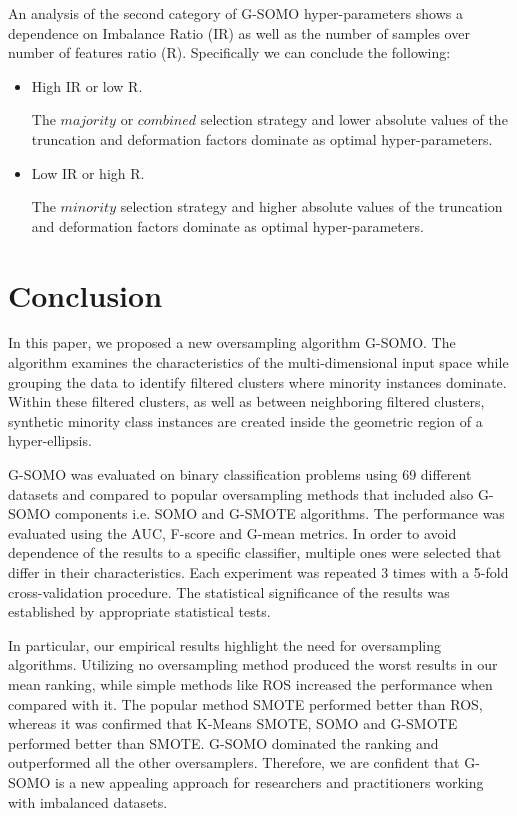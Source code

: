 \documentclass[parskip=full]{scrartcl}
\begin{document}
An analysis of the second category of G-SOMO hyper-parameters shows a dependence on Imbalance Ratio (IR) as well as the number of samples over number of features ratio (R). Specifically we can conclude the following:

\begin{itemize}

	\renewcommand\labelitemi{--}

	\item High IR or low R.
	
	The $ majority $ or $ combined $ selection strategy and lower absolute values of the truncation and deformation factors dominate as optimal hyper-parameters.

	\item Low IR or high R.
	
	The $ minority $ selection strategy and higher absolute values of the truncation and deformation factors dominate as optimal hyper-parameters.

\end{itemize}

\section{Conclusion}

In this paper, we proposed a new oversampling algorithm G-SOMO. The algorithm examines the characteristics of the multi-dimensional input space while grouping the data to identify filtered clusters where minority instances dominate. Within these filtered clusters, as well as between neighboring filtered clusters, synthetic minority class instances are created inside the geometric region of a hyper-ellipsis.

G-SOMO was evaluated on binary classification problems using 69 different datasets and compared to popular oversampling methods that included also G-SOMO components i.e. SOMO and G-SMOTE algorithms. The performance was evaluated using the AUC, F-score and G-mean metrics. In order to avoid dependence of the results to a specific classifier, multiple ones were selected that differ in their characteristics. Each experiment was repeated 3 times with a 5-fold cross-validation procedure. The statistical significance of the results was established by appropriate statistical tests.

In particular, our empirical results highlight the need for oversampling algorithms. Utilizing no oversampling method produced the worst results in our mean ranking, while simple methods like ROS increased the performance when compared with it. The popular method SMOTE performed better than ROS, whereas it was confirmed that K-Means SMOTE, SOMO and G-SMOTE performed better than SMOTE. G-SOMO dominated the ranking and outperformed all the other oversamplers. Therefore, we are confident that G-SOMO is a new appealing approach for researchers and practitioners working with imbalanced datasets.
\end{document}
